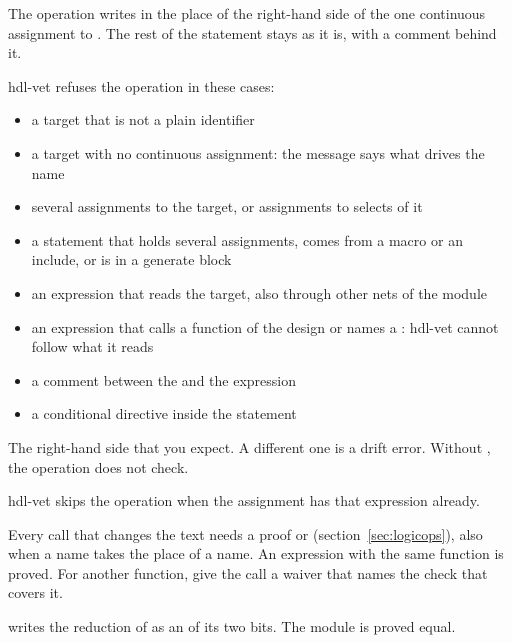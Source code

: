 \begin{entry}{}
\item[Writes] The operation writes  in the place of the right-hand side of the
  one continuous assignment to . The rest of the statement stays as it is,
  with a comment behind it.
\item[Refused] hdl-vet refuses the operation in these cases:
  \begin{itemize}
  \item a target that is not a plain identifier
  \item a target with no continuous assignment: the message says what drives the name
  \item several assignments to the target, or assignments to selects of it
  \item a statement that holds several assignments, comes from a macro or an include, or
    is in a generate block
  \item an expression that reads the target, also through other nets of the module
  \item an expression that calls a function of the design or names a : hdl-vet
    cannot follow what it reads
  \item a comment between the \code{=} and the expression
  \item a conditional directive inside the statement
  \end{itemize}
\item[was] The right-hand side that you expect. A different one is a drift error.
  Without , the operation does not check.
\item[Again] hdl-vet skips the operation when the assignment has that expression already.
\item[Waiver] Every call that changes the text needs a proof or 
  (section~\ref{sec:logicops}), also when a name takes the place of a name. An expression
  with the same function is proved. For another function, give the call a waiver that
  names the check that covers it.
\item[Example]  writes the reduction of  as an
   of its two bits. The module is proved equal.
\end{entry}





